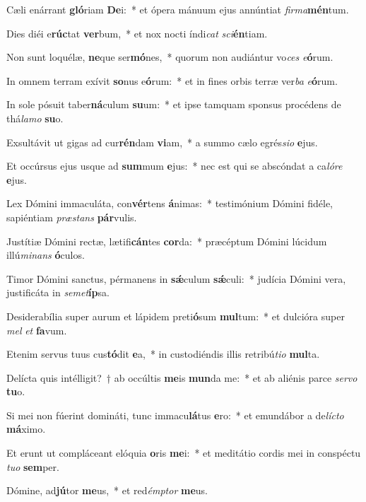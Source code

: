 \item Cæli enárrant \textbf{gló}riam \textbf{De}i:~* et ópera mánuum ejus annúntiat \textit{fir}\textit{ma}\textbf{mén}tum.
\item Dies diéi e\textbf{rúc}tat \textbf{ver}bum,~* et nox nocti índi\textit{cat} \textit{sci}\textbf{én}tiam.
\item Non sunt loquélæ, \textbf{ne}que ser\textbf{mó}nes,~* quorum non audiántur vo\textit{ces} \textit{e}\textbf{ó}rum.
\item In omnem terram exívit \textbf{so}nus e\textbf{ó}rum:~* et in fines orbis terræ ver\textit{ba} \textit{e}\textbf{ó}rum.
\item In sole pósuit taber\textbf{ná}culum \textbf{su}um:~* et ipse tamquam sponsus procédens de thá\textit{la}\textit{mo} \textbf{su}o.
\item Exsultávit ut gigas ad cur\textbf{rén}dam \textbf{vi}am,~* a summo cælo egrés\textit{si}\textit{o} \textbf{e}jus.
\item Et occúrsus ejus usque ad \textbf{sum}mum \textbf{e}jus:~* nec est qui se abscóndat a ca\textit{ló}\textit{re} \textbf{e}jus.
\item Lex Dómini immaculáta, con\textbf{vér}tens \textbf{á}nimas:~* testimónium Dómini fidéle, sapiéntiam \textit{præ}\textit{stans} \textbf{pár}vulis.
\item Justítiæ Dómini rectæ, lætifi\textbf{cán}tes \textbf{cor}da:~* præcéptum Dómini lúcidum illú\textit{mi}\textit{nans} \textbf{ó}culos.
\item Timor Dómini sanctus, pérmanens in \textbf{sǽ}culum \textbf{sǽ}culi:~* judícia Dómini vera, justificáta in \textit{se}\textit{met}\textbf{íp}sa.
\item Desiderabília super aurum et lápidem preti\textbf{ó}sum \textbf{mul}tum:~* et dulcióra super \textit{mel} \textit{et} \textbf{fa}vum.
\item Etenim servus tuus cus\textbf{tó}dit \textbf{e}a,~* in custodiéndis illis retribú\textit{ti}\textit{o} \textbf{mul}ta.
\item Delícta quis intélligit?~† ab occúltis \textbf{me}is \textbf{mun}da me:~* et ab aliénis parce \textit{ser}\textit{vo} \textbf{tu}o.
\item Si mei non fúerint domináti, tunc immacu\textbf{lá}tus \textbf{e}ro:~* et emundábor a de\textit{líc}\textit{to} \textbf{má}ximo.
\item Et erunt ut compláceant elóquia \textbf{o}ris \textbf{me}i:~* et meditátio cordis mei in conspéctu \textit{tu}\textit{o} \textbf{sem}per.
\item Dómine, ad\textbf{jú}tor \textbf{me}us,~* et red\textit{émp}\textit{tor} \textbf{me}us.
